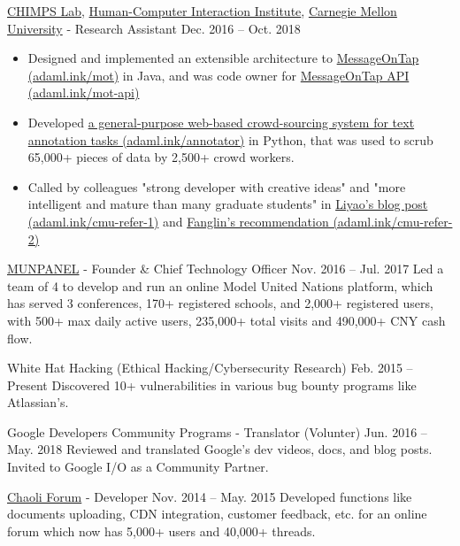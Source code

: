 \documentclass[hidelinks__VERSION__]{adamyi-cv}
\begin{document}
\begin{entrylist}


\entry
{\href{http://cmuchimps.org/}{CHIMPS Lab}, \href{https://www.hcii.cmu.edu/}{Human-Computer Interaction Institute}, \href{https://www.cmu.edu/}{Carnegie Mellon University} - Research Assistant}
{Dec. 2016 -- Oct. 2018}
{
\begin{minipage}[t]{1\linewidth}
\begin{itemize}[leftmargin=*,align=left,noitemsep]
\item Designed and implemented an extensible architecture to \href{https://adaml.ink/mot}{MessageOnTap (adaml.ink/mot)} in Java, and was code owner for \href{https://adaml.ink/mot-api}{MessageOnTap API (adaml.ink/mot-api)}
\item Developed \href{https://adaml.ink/annotator}{a general-purpose web-based crowd-sourcing system for text annotation tasks (adaml.ink/annotator)} in Python, that was used to scrub 65,000+ pieces of data by 2,500+ crowd workers.
\item Called by colleagues "strong developer with creative ideas" and "more intelligent and mature than many graduate students" in \href{https://adaml.ink/cmu-refer-1}{Liyao's blog post (adaml.ink/cmu-refer-1)} and \href{https://adaml.ink/cmu-refer-2}{Fanglin's recommendation (adaml.ink/cmu-refer-2)}
\end{itemize}
\end{minipage}
}


\entry
{\href{https://www.munpanel.com}{MUNPANEL} - Founder \& Chief Technology Officer}
{Nov. 2016 -- Jul. 2017}
{Led a team of 4 to develop and run an online Model United Nations platform, which has served 3 conferences, 170+ registered schools, and 2,000+ registered users, with 500+ max daily active users, 235,000+ total visits and 490,000+ CNY cash flow.}


\entry
{White Hat Hacking (Ethical Hacking/Cybersecurity Research)}
{Feb. 2015 -- Present}
{Discovered 10+ vulnerabilities in various bug bounty programs like Atlassian's.}


\entry
{Google Developers Community Programs - Translator (Volunter)}
{Jun. 2016 -- May. 2018}
{Reviewed and translated Google's dev videos, docs, and blog posts. Invited to Google I/O as a Community Partner.}


\entry
{\href{https://chaoli.club}{Chaoli Forum} - Developer}
{Nov. 2014 -- May. 2015}
{Developed functions like documents uploading, CDN integration, customer feedback, etc. for an online forum which now has 5,000+ users and 40,000+ threads.}

\end{entrylist}
\end{document}
